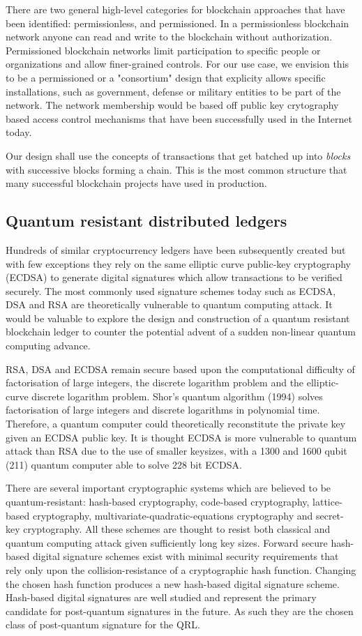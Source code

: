 There are two general high-level categories for blockchain approaches that have been identified: permissionless, and
permissioned. In a permissionless blockchain network anyone can read and write to the blockchain without authorization.
Permissioned blockchain networks limit participation to specific people or organizations and allow finer-grained
controls.  For our use case, we envision this to be a permissioned or a "consortium" design that explicity allows
specific installations, such as government, defense or military entities to be part of the network.  The network
membership would be based off public key crytography based access control mechanisms that have been successfully used in
the Internet today.

Our design shall use the concepts of transactions that get batched up into {\it blocks} with successive blocks forming a
chain. This is the most common structure that many successful blockchain projects have used in production.

\subsection{Quantum resistant distributed ledgers}

Hundreds of similar cryptocurrency ledgers have been subsequently created but with few exceptions they rely on the same
elliptic curve public-key cryptography (ECDSA) to generate digital signatures which allow transactions to be verified
securely. The most commonly used signature schemes today such as ECDSA, DSA and RSA are theoretically vulnerable to
quantum computing attack. It would be valuable to explore the design and construction of a quantum resistant blockchain
ledger to counter the potential advent of a sudden non-linear quantum computing advance.

RSA, DSA and ECDSA remain secure based upon the computational difficulty of factorisation of large integers, the
discrete logarithm problem and the elliptic-curve discrete logarithm problem. Shor’s quantum
algorithm (1994) solves factorisation of large integers and discrete logarithms in polynomial time. Therefore,
a quantum computer could theoretically reconstitute the private key given an ECDSA public key. It is
thought ECDSA is more vulnerable to quantum attack than RSA due to the use of smaller keysizes, with a
1300 and 1600 qubit (211) quantum computer able to solve 228 bit ECDSA.

There are several important cryptographic systems which are believed to be quantum-resistant: hash-based cryptography,
code-based cryptography, lattice-based cryptography, multivariate-quadratic-equations cryptography and secret-key
cryptography. All these schemes are thought to resist both classical and quantum computing attack given sufficiently
long key sizes.  Forward secure hash-based digital signature schemes exist with minimal security requirements that rely
only upon the collision-resistance of a cryptographic hash function. Changing the chosen hash function produces a new
hash-based digital signature scheme. Hash-based digital signatures are well studied and represent the primary candidate
for post-quantum signatures in the future. As such they are the chosen class of post-quantum signature for the QRL.


